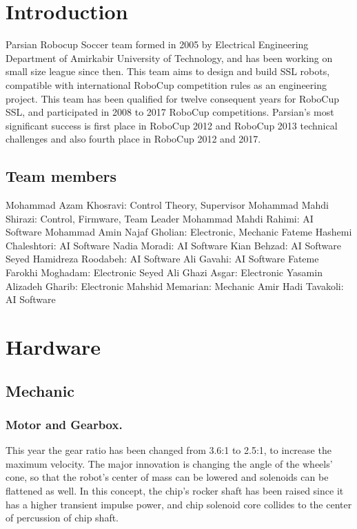 \documentclass{llncs}
\begin{document}
\section{Introduction}
%
Parsian Robocup Soccer team formed in 2005 by Electrical Engineering Department of Amirkabir University of Technology, and has been working on small size league since then. This team aims to design and build SSL robots, compatible with international RoboCup competition rules as an engineering project. This team has been qualified for twelve consequent years for RoboCup SSL, and participated in 2008 to 2017 RoboCup competitions. Parsian's most significant success is first place in RoboCup 2012 and RoboCup 2013 technical challenges and also fourth place in RoboCup 2012 and 2017.
%
\newpage

\subsection{Team members}
%
Mohammad Azam Khosravi: Control Theory, Supervisor \newline
Mohammad Mahdi Shirazi: Control, Firmware, Team Leader \newline
Mohammad Mahdi Rahimi: AI Software \newline
Mohammad Amin Najaf Gholian: Electronic, Mechanic \newline
Fateme Hashemi Chaleshtori: AI Software \newline
Nadia Moradi: AI Software \newline
Kian Behzad: AI Software \newline 
Seyed Hamidreza Roodabeh: AI Software \newline 
Ali Gavahi: AI Software \newline
Fateme Farokhi Moghadam: Electronic \newline
Seyed Ali Ghazi Asgar: Electronic \newline
Yasamin Alizadeh Gharib: Electronic \newline 
Mahshid Memarian: Mechanic \newline
Amir Hadi Tavakoli: AI Software
%
\section {Hardware}
%
\subsection{Mechanic}
\subsubsection{Motor and Gearbox.}
\label{subsubsec:MotorAndGearbox}
This year the gear ratio has been changed from 3.6:1 to 2.5:1, to increase the maximum velocity.
The major innovation is changing the angle of the wheels' cone, so that the robot's center of mass can be lowered and solenoids can be flattened as well.
In this concept, the chip's rocker shaft has been raised since it has a higher transient impulse power, and chip solenoid core collides to the center of percussion of chip shaft.
\end{document}

